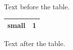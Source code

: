 \documentclass[12pt]{article}
\begin{document}
Text before the table.

{\small\begin{tabular}{|l|r|}\hline small & 1\\\hline\end{tabular}}

Text after the table.
\end{document}
